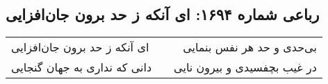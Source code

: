 \begin{center}
\section*{رباعی شماره ۱۶۹۴: ای آنکه ز حد برون جان‌افزایی}
\label{sec:1694}
\begin{longtable}{l p{0.5cm} r}
ای آنکه ز حد برون جان‌افزایی
&&
بی‌حدی و حد هر نفس بنمایی
\\
دانی که نداری به جهان گنجایی
&&
در غیب بچفسیدی و بیرون نایی
\\
\end{longtable}
\end{center}
